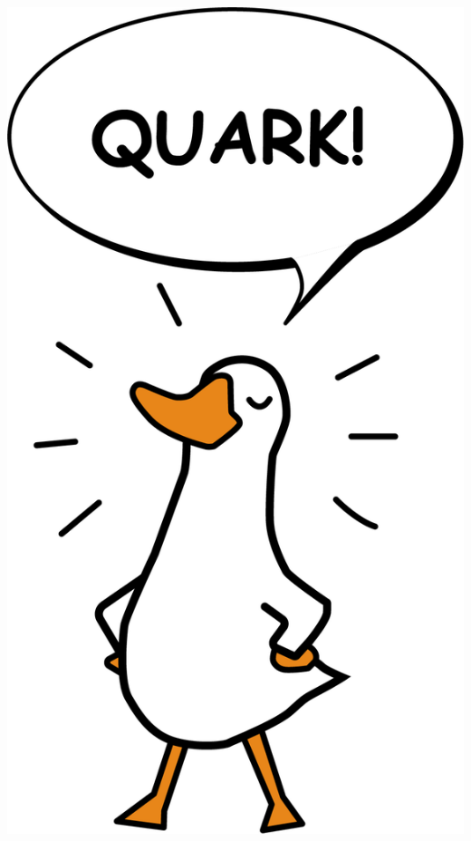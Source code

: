 \documentclass[22pt,margin=0.5in,innermargin=-4.5in,blockverticalspace=-0.5in]{tikzposter}
\begin{document}
\begin{columns}
{\begin{center}
\includegraphics[scale=1.08]{Figures/StandingDuck.png}\end{center}

}

\end{columns}
\end{document}
